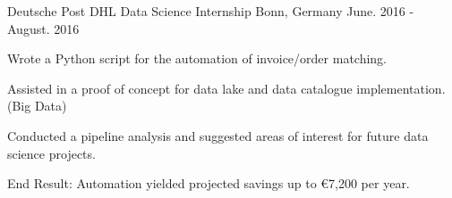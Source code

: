 

\begin{cventries}

  \cventry
    {Deutsche Post DHL} %
    {Data Science Internship} %
    {Bonn, Germany} %
    {June. 2016 - August. 2016} %
    {
      \begin{cvitems} %
        \item{Wrote a Python script for the automation of invoice/order matching.}
        \item{Assisted in a proof of concept for data lake and data catalogue implementation. (Big Data)}
        \item{Conducted a pipeline analysis and suggested areas of interest for future data science projects.}
        \item{End Result: Automation yielded projected savings up to €7,200 per year.}
      \end{cvitems}
    }

\end{cventries}
